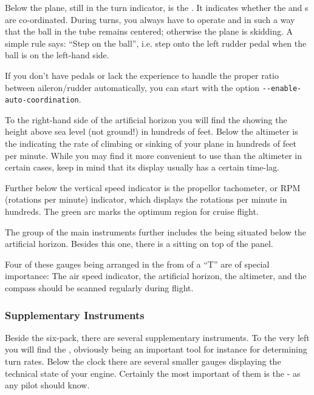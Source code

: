 \begin{itemize}
Below the plane, still in the turn indicator, is the . It
indicates whether the  and s are co-ordinated.
During turns, you always have to operate  and 
in such a way that the ball in the tube
remains centered; otherwise the plane is skidding. A simple rule says:
``Step on the ball'', i.e. step onto the left rudder pedal when
the ball is on the left-hand side.
\medskip

If you don't have pedals or lack the experience to handle the proper
ratio between aileron/rudder automatically, you can start \FlightGear{}
with the option \texttt{-$ $-enable-auto-coordination}.

To the right-hand side of the artificial horizon you will find the
 showing the height above sea level (not ground!) in hundreds
of feet.  Below the altimeter is the 
indicating the rate of climbing or sinking of your plane in hundreds of feet
per minute. While you may find it more convenient to use than the altimeter
in certain cases, keep in mind that its display usually has a certain time-lag.

Further below the vertical speed indicator is the propellor tachometer, or RPM
(rotations per minute) indicator, which displays the
rotations per minute in hundreds. The green arc marks the optimum region for
cruise flight.

The group of the main instruments further includes the 
being situated below the artificial horizon. Besides this one, there is a
 sitting on top of the panel.

Four of these gauges being arranged in the from of a ``T'' are of special
importance: The air speed indicator, the artificial horizon, the altimeter,
and the compass should be scanned regularly during flight.

\subsubsection{Supplementary Instruments}

Beside the six-pack, there are several supplementary instruments. To the very
left you will find the , obviously being an important tool
for instance for determining turn rates. Below the clock there are
several smaller gauges displaying the technical state of your engine.
Certainly the most important of them is the  - as
any pilot should know.


\end{itemize}
